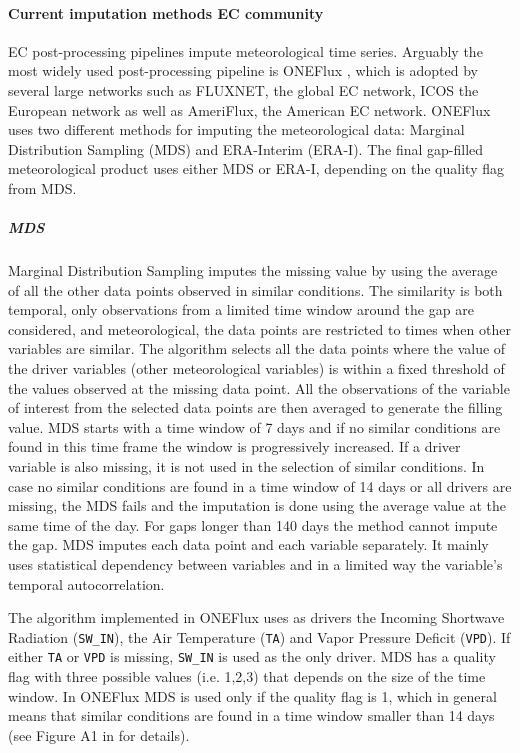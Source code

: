 \documentclass{article}
\begin{document}
\paragraph{Current imputation methods EC community} EC post-processing pipelines impute meteorological time series. Arguably the most widely used post-processing pipeline is \textsf{ONEFlux} \cite{pastorello_fluxnet2015_2020}, which is adopted by several large networks such as FLUXNET, the global EC network, ICOS the European network as well as AmeriFlux, the American EC network.
\textsf{ONEFlux} uses two different methods for imputing the meteorological data: Marginal Distribution Sampling (MDS) and ERA-Interim (ERA-I). The final gap-filled meteorological product uses either MDS or ERA-I, depending on the quality flag from MDS.
\subparagraph{MDS} Marginal Distribution Sampling \cite{reichstein_separation_2005-3} imputes the missing value by using the average of all the other data points observed in similar conditions. The similarity is both temporal, only observations from a limited time window around the gap are considered, and meteorological, the data points are restricted to times when other variables are similar. 
The algorithm selects all the data points where the value of the driver variables (other meteorological variables) is within a fixed threshold of the values observed at the missing data point. All the observations of the variable of interest from the selected data points are then averaged to generate the filling value. MDS starts with a time window of 7 days and if no similar conditions are found in this time frame the window is progressively increased. If a driver variable is also missing, it is not used in the selection of similar conditions. 
In case no similar conditions are found in a time window of 14 days or all drivers are missing, the MDS fails and the imputation is done using the average value at the same time of the day. For gaps longer than 140 days the method cannot impute the gap.
MDS imputes each data point and each variable separately. It mainly uses statistical dependency between variables and in a limited way the variable's temporal autocorrelation. 

The algorithm implemented in \textsf{ONEFlux} uses as drivers the Incoming Shortwave Radiation (\texttt{SW\_IN}), the Air Temperature (\texttt{TA}) and Vapor Pressure Deficit (\texttt{VPD}). If either \texttt{TA} or \texttt{VPD} is missing, \texttt{SW\_IN} is used as the only driver. 
MDS has a quality flag with three possible values (i.e. 1,2,3) that depends on the size of the time window. In \textsf{ONEFlux} MDS is used only if the quality flag is 1, which in general means that similar conditions are found in a time window smaller than 14 days (see Figure A1 in \textcite{reichstein_separation_2005-3} for details). 
\end{document}
